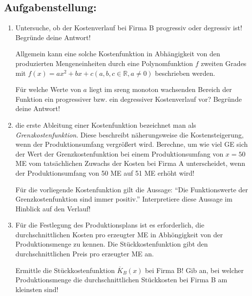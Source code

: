 \begin{langesbeispiel}
\subsection{Aufgabenstellung:}
\begin{enumerate}
	\item Untersuche, ob der Kostenverlauf bei Firma B progressiv oder degressiv ist! Begründe deine Antwort!
	
	Allgemein kann eine solche Kostenfunktion in Abhängigkeit von den produzierten Mengeneinheiten durch eine Polynomfunktion $f$ zweiten Grades mit $f(x)=ax^2+bx+c (a,b,c\in\mathbb{R},a\neq 0)$ beschrieben werden.
	
	Für welche Werte von $a$ liegt im sreng monoton wachsenden Bereich der Funktion ein progressiver bzw. ein degressiver Kostenverlauf vor? Begründe deine Antwort!
	
	\item die erste Ableitung einer Kostenfunktion bezeichnet man als \textit{Grenzkostenfunktion}. Diese beschreibt näherungsweise die Kostensteigerung, wenn der Produktionsumfang vergrößert wird. Berechne, um wie viel GE sich der Wert der Grenzkostenfunktion bei einem Produktionsumfang von $x=50$ ME vom tatsächlichen Zuwachs der Kosten bei Firma A unterscheidet, wenn der Produktionsumfang von 50 ME auf 51 ME erhöht wird!
	
	Für die vorliegende Kostenfunktion gilt die Aussage: "`Die Funktionswerte der Grenzkostenfunktion sind immer positiv."' Interpretiere diese Aussage im Hinblick auf den Verlauf!
	
	\item Für die Festlegung des Produktionsplans ist es erforderlich, die durchschnittlichen Kosten pro erzeugter ME in Abhöngigkeit von der Produktionsmenge zu kennen. Die Stückkostenfunktion gibt den durchschnittlichen Preis pro erzeugter ME an.
	
	Ermittle die Stückkostenfunktion $\overline{K}_B(x)$ bei Firma B! Gib an, bei welcher Produktionsmenge die durchschnittlichen Stückkosten bei Firma B am kleinsten sind!
				\end{enumerate}\leer
				
				
\end{langesbeispiel}
